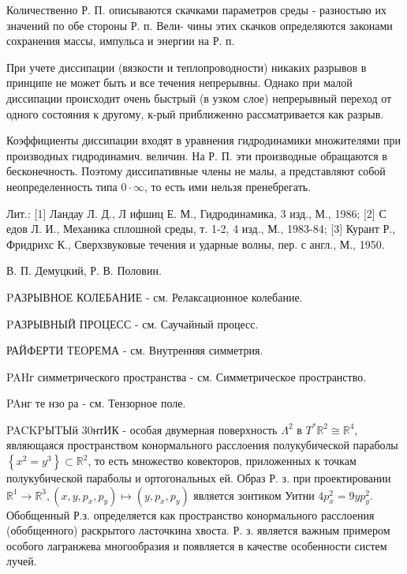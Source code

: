 \documentclass[10pt]{article}
\begin{document}
Количественно Р. П. описываются скачками параметров среды - разностыю их значений по обе стороны Р. п. Вели- чины этих скачков определяются законами сохранения массы, импульса и энергии на Р. п.



При учете диссипации (вязкости и теплопроводности) никаких разрывов в принципе не может быть и все течения непрерывны. Однако при малой диссипации происходит очень быстрый (в узком слое) непрерывный переход от одного состояния к другому, к-рый приближенно рассматривается как разрыв.



Коэффициенты диссипации входят в уравнения гидродинамики множителями при производных гидродинамич. величин. На Р. П. эти производные обращаются в бесконечность. Поэтому диссипативные члены не малы, а представляют собой неопределенность типа $0 \cdot \infty$, то есть ими нельзя пренебрегать.



Лит.: [1] Ландау Л. Д., Л ифшиц Е. М., Гидродинамика, 3 изд., М., 1986; [2] С едов Л. И., Механика сплошной среды, т. 1-2, 4 изд., М., 1983-84; [3] Курант Р., Фридрихс К., Сверхзвуковые течения и ударные волны, пер. с англ., М., 1950.



В. П. Демуцкий, Р. В. Половин.



PАЗРЫВНОЕ КОЛЕБАНИЕ - см. Релаксационное колебание.



PАЗРЫВНЫЙ ПРОЦЕСС - см. Саучайный процесс.



РАЙФЕРТИ ТЕОРЕМА - см. Внутренняя симметрия.



PAHг симметрического пространства - см. Симметрическое пространство.



PAнг те нзо ра - см. Тензорное поле.



PACKPЫTЫй 30нтИК - особая двумерная поверхность $\Lambda^{2}$ в $T^{*} \mathbb{R}^{2} \cong \mathbb{R}^{4}$, являющаяся пространством конормального расслоения полукубической параболы $\left\{x^{2}=y^{3}\right\} \subset \mathbb{R}^{2}$, то есть множество ковекторов, приложенных к точкам полукубической параболы и ортогональных ей. Образ Р. з. при проектировании $\mathbb{R}^{1} \rightarrow \mathbb{R}^{3},\left(x, y, p_{x}, p_{y}\right) \mapsto\left(y, p_{x}, p_{y}\right)$ является зонтиком Уитни $4 p_{x}^{2}=9 y p_{y}^{2}$. Обобщенный Р.з. определяется как пространство конормального расслоения (обобщенного) раскрытого ласточкина хвоста. Р. з. является важным примером особого лагранжева многообразия и появляется в качестве особенности систем лучей.
\end{document}
